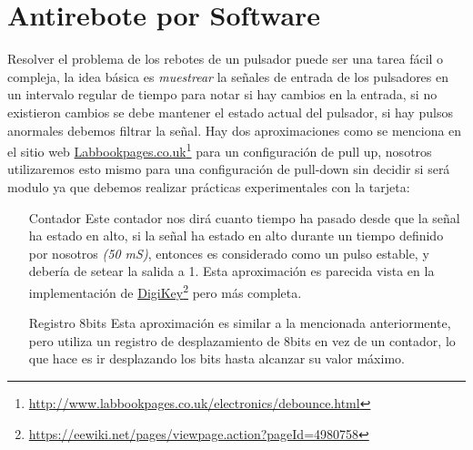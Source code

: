 \documentclass[paper=a4, fontsize=12pt]{article} 		%
\newcommand\fnurl[2]{%
\href{#2}{#1}\footnote{\url{#2}}%
}
\numberwithin{equation}{section}						%
\numberwithin{table}{section} 							%
\begin{document}
\section{Antirebote por Software}
Resolver el problema de los rebotes de un pulsador puede ser una tarea fácil o compleja, la idea básica es \emph{muestrear} la señales de entrada de los pulsadores en un intervalo regular de tiempo para notar si hay cambios en la entrada, si no existieron cambios se debe mantener el estado actual del pulsador, si hay pulsos anormales debemos filtrar la señal. Hay dos aproximaciones como se menciona en el sitio web \fnurl{Labbookpages.co.uk}{http://www.labbookpages.co.uk/electronics/debounce.html} para un configuración de pull up, nosotros utilizaremos esto mismo para una configuración de pull-down sin decidir si será modulo ya que debemos realizar prácticas experimentales con la tarjeta:
\begin{itemize}
	\item[Contador] Este contador  nos dirá cuanto tiempo ha pasado desde que la señal ha estado en alto, si la señal  ha estado en alto durante un tiempo definido por nosotros \textit{(50 mS)}, entonces es considerado como un pulso estable, y debería de setear la salida a 1. Esta aproximación es parecida vista en la implementación de \fnurl{DigiKey}{https://eewiki.net/pages/viewpage.action?pageId=4980758} pero más completa.
    \item[Registro 8bits] Esta aproximación es similar a la mencionada anteriormente, pero utiliza un registro de desplazamiento de 8bits en vez de un contador, lo que hace es ir desplazando los bits hasta alcanzar su valor máximo.

\end{itemize}
\end{document}
